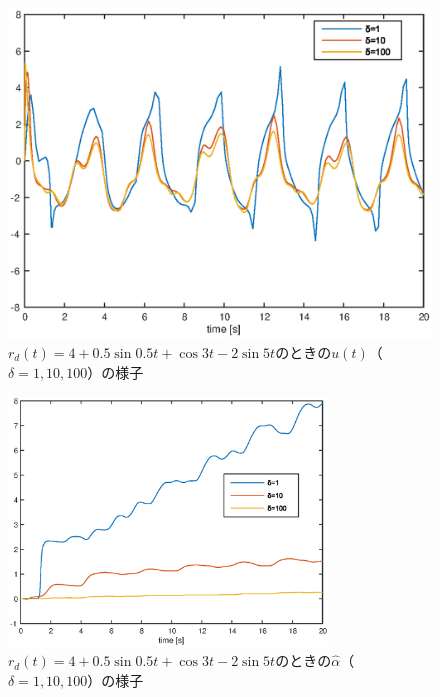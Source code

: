 \documentclass[a4paper,12pt]{jarticle}
\begin{document}
%
%
\begin{figure}[htb]
    \begin{center}
       \includegraphics[width=140mm]{fig/u_rdsin.eps}
        \caption{$r_d(t)=4+0.5\sin 0.5t + \cos 3t - 2\sin 5t$のときの$u(t)$（$\delta=1,10,100$）の様子}
        \label{fig:u_rdsin}
    \end{center}
\end{figure}
%
%
\begin{figure}[htb]
    \begin{center}
       \includegraphics[width=85mm]{fig/alpha_h_rdsin.eps}
        \caption{$r_d(t)=4+0.5\sin 0.5t + \cos 3t - 2\sin 5t$のときの$\hat{\alpha}$（$\delta=1,10,100$）の様子}
        \label{fig:alpha_h_rdsin}
    \end{center}
\end{figure}
%
%
\end{document}
